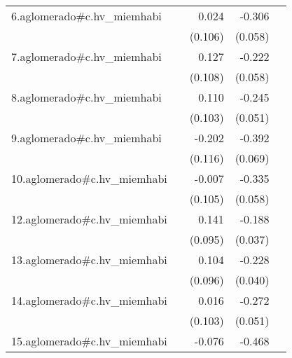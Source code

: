 {\begin{longtable}{l*{4}{D{.}{.}{-1}}}
\addlinespace
6.aglomerado#c.hv\_miemhabi&                     &       0.024         &      -0.306\sym{***}&                     \\
            &                     &     (0.106)         &     (0.058)         &                     \\
\addlinespace
7.aglomerado#c.hv\_miemhabi&                     &       0.127         &      -0.222\sym{***}&                     \\
            &                     &     (0.108)         &     (0.058)         &                     \\
\addlinespace
8.aglomerado#c.hv\_miemhabi&                     &       0.110         &      -0.245\sym{***}&                     \\
            &                     &     (0.103)         &     (0.051)         &                     \\
\addlinespace
9.aglomerado#c.hv\_miemhabi&                     &      -0.202         &      -0.392\sym{***}&                     \\
            &                     &     (0.116)         &     (0.069)         &                     \\
\addlinespace
10.aglomerado#c.hv\_miemhabi&                     &      -0.007         &      -0.335\sym{***}&                     \\
            &                     &     (0.105)         &     (0.058)         &                     \\
\addlinespace
12.aglomerado#c.hv\_miemhabi&                     &       0.141         &      -0.188\sym{***}&                     \\
            &                     &     (0.095)         &     (0.037)         &                     \\
\addlinespace
13.aglomerado#c.hv\_miemhabi&                     &       0.104         &      -0.228\sym{***}&                     \\
            &                     &     (0.096)         &     (0.040)         &                     \\
\addlinespace
14.aglomerado#c.hv\_miemhabi&                     &       0.016         &      -0.272\sym{***}&                     \\
            &                     &     (0.103)         &     (0.051)         &                     \\
\addlinespace
15.aglomerado#c.hv\_miemhabi&                     &      -0.076         &      -0.468\sym{***}&                     \\

\end{longtable}}
